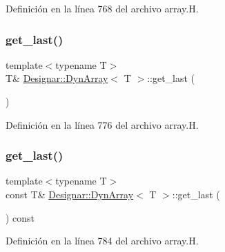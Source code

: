 Definición en la línea 768 del archivo array.\+H.

\mbox{\label{class_designar_1_1_dyn_array_ad69873465e7540a02fceaecc4ffc9b1e}} 
\subsubsection{\texorpdfstring{get\+\_\+last()}{get\_last()}\hspace{0.1cm}{\footnotesize\ttfamily [1/2]}}
{\footnotesize\ttfamily template$<$typename T$>$ \\
T\& \hyperlink{class_designar_1_1_dyn_array}{Designar\+::\+Dyn\+Array}$<$ T $>$\+::get\+\_\+last (\begin{DoxyParamCaption}{ }\end{DoxyParamCaption})\hspace{0.3cm}{\ttfamily [inline]}}



Definición en la línea 776 del archivo array.\+H.

\mbox{\label{class_designar_1_1_dyn_array_a45db099e907ae4ed4398cfea487bb4d7}} 
\subsubsection{\texorpdfstring{get\+\_\+last()}{get\_last()}\hspace{0.1cm}{\footnotesize\ttfamily [2/2]}}
{\footnotesize\ttfamily template$<$typename T$>$ \\
const T\& \hyperlink{class_designar_1_1_dyn_array}{Designar\+::\+Dyn\+Array}$<$ T $>$\+::get\+\_\+last (\begin{DoxyParamCaption}{ }\end{DoxyParamCaption}) const\hspace{0.3cm}{\ttfamily [inline]}}



Definición en la línea 784 del archivo array.\+H.

\mbox{\label{class_designar_1_1_dyn_array_a480d65a0b64bc30d26806cdbd07e66f1}} 

